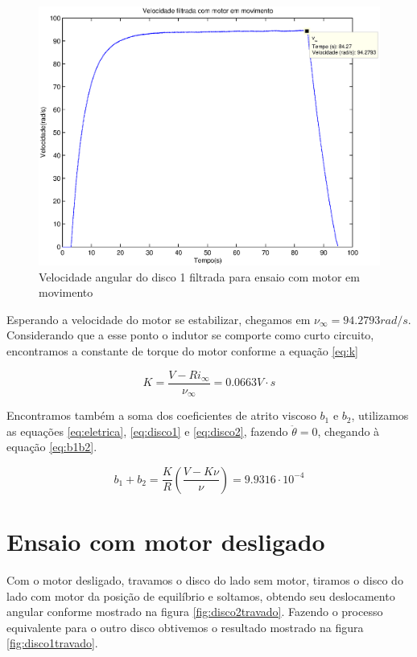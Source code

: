 \documentclass{article}
\begin{document}
\begin{figure}[H]
	\centering
	\includegraphics[width=0.8\linewidth]{../ensaiorvF}
	\caption{Velocidade angular do disco 1 filtrada para ensaio com motor em movimento}
	\label{fig:ensaiorvF}
\end{figure}

Esperando a velocidade do motor se estabilizar, chegamos em $\nu_{\infty}=94.2793rad/s$. Considerando que a esse ponto o indutor se comporte como curto circuito, encontramos a constante de torque do motor conforme a equação \ref{eq:k}

\begin{equation}
\label{eq:k}
K=\frac{V-Ri_{\infty}}{\nu_{\infty}}=0.0663 V\cdot s
\end{equation}

Encontramos também a soma dos coeficientes de atrito viscoso $b_1$ e $b_2$, utilizamos as equações \ref{eq:eletrica}, \ref{eq:disco1} e \ref{eq:disco2}, fazendo $\ddot{\theta}=0$, chegando à equação \ref{eq:b1b2}.

\begin{equation}
\label{eq:b1b2}
b_1+b_2=\frac{K}{R}\left(\frac{V-K\nu}{\nu}\right)=9.9316\cdot10^{-4}
\end{equation}

\section{Ensaio com motor desligado}
Com o motor desligado, travamos o disco do lado sem motor, tiramos o disco do lado com motor da posição de equilíbrio e soltamos, obtendo seu deslocamento angular conforme mostrado na figura \ref{fig:disco2travado}. Fazendo o processo equivalente para o outro disco obtivemos o resultado mostrado na figura \ref{fig:disco1travado}.
\end{document}
